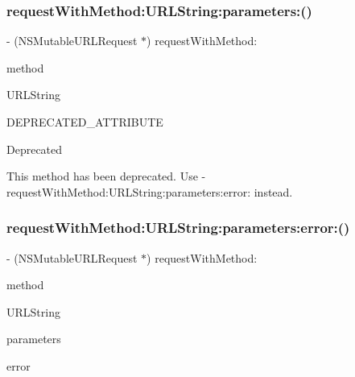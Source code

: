 \subsubsection{\texorpdfstring{request\+With\+Method\+:\+U\+R\+L\+String\+:parameters\+:()}{requestWithMethod:URLString:parameters:()}\hspace{0.1cm}{\footnotesize\ttfamily [3/3]}}
{\footnotesize\ttfamily -\/ (N\+S\+Mutable\+U\+R\+L\+Request $\ast$) request\+With\+Method\+: \begin{DoxyParamCaption}\item[{(N\+S\+String $\ast$)}]{method }\item[{URLString:(N\+S\+String $\ast$)}]{U\+R\+L\+String }\item[{parameters:(id)}]{D\+E\+P\+R\+E\+C\+A\+T\+E\+D\+\_\+\+A\+T\+T\+R\+I\+B\+U\+TE }\end{DoxyParamCaption}}

\begin{DoxyRefDesc}{Deprecated}
\item[\mbox{\hyperlink{deprecated__deprecated000012}{Deprecated}}]This method has been deprecated. Use -\/request\+With\+Method\+:U\+R\+L\+String\+:parameters\+:error\+: instead. \end{DoxyRefDesc}
\mbox{\label{interface_a_f_h_t_t_p_request_serializer_ac348d84d91a02fe1461b6ecf00129ef5}} 
\subsubsection{\texorpdfstring{request\+With\+Method\+:\+U\+R\+L\+String\+:parameters\+:error\+:()}{requestWithMethod:URLString:parameters:error:()}\hspace{0.1cm}{\footnotesize\ttfamily [1/3]}}
{\footnotesize\ttfamily -\/ (N\+S\+Mutable\+U\+R\+L\+Request $\ast$) request\+With\+Method\+: \begin{DoxyParamCaption}\item[{(N\+S\+String $\ast$)}]{method }\item[{URLString:(N\+S\+String $\ast$)}]{U\+R\+L\+String }\item[{parameters:(nullable id)}]{parameters }\item[{error:(N\+S\+Error $\ast$\+\_\+\+\_\+nullable \+\_\+\+\_\+autoreleasing $\ast$)}]{error }\end{DoxyParamCaption}}

